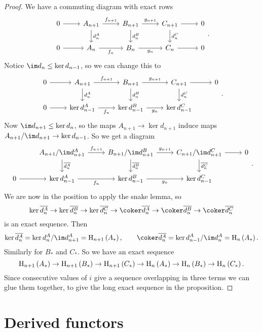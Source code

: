 \begin{proof}
We have a commuting diagram with exact rows
$$
\begin{tikzcd}
0 \arrow{r} & A_{n + 1} \arrow{r}{f_{n + 1}} \arrow{d}{d_n^A} & B_{n + 1} \arrow{r}{g_{n + 1}} \arrow{d}{d_n^B} & C_{n + 1} \arrow{r} \arrow{d}{d_n^C} & 0 \\
0 \arrow{r} & A_n \arrow{r}[swap]{f_n} & B_n \arrow{r}[swap]{g_n} & C_n \arrow{r} & 0
\end{tikzcd}.
$$
Notice $ \im d_n \le \ker d_{n - 1} $, so we can change this to
$$
\begin{tikzcd}
0 \arrow{r} & A_{n + 1} \arrow{r}{f_{n + 1}} \arrow{d}{d_n^A} & B_{n + 1} \arrow{r}{g_{n + 1}} \arrow{d}{d_n^B} & C_{n + 1} \arrow{r} \arrow{d}{d_n^C} & 0 \\
0 \arrow{r} & \ker d_{n - 1}^A \arrow{r}[swap]{f_n} & \ker d_{n - 1}^B \arrow{r}[swap]{g_n} & \ker d_{n - 1}^C &
\end{tikzcd}.
$$
Now $ \im d_{n + 1} \le \ker d_n $, so the maps $ A_{n + 1} \to \ker d_{n + 1} $ induce maps $ A_{n + 1} / \im d_{n + 1} \to \ker d_{n - 1} $. So we get a diagram
$$
\begin{tikzcd}
& A_{n + 1} / \im d_{n + 1}^A \arrow{r}{f_{n + 1}} \arrow{d}{\overline{d_n^A}} & B_{n + 1} / \im d_{n + 1}^B \arrow{r}{g_{n + 1}} \arrow{d}{\overline{d_n^B}} & C_{n + 1} / \im d_{n + 1}^C \arrow{r} \arrow{d}{\overline{d_n^C}} & 0 \\
0 \arrow{r} & \ker d_{n - 1}^A \arrow{r}[swap]{f_n} & \ker d_{n - 1}^B \arrow{r}[swap]{g_n} & \ker d_{n - 1}^C &
\end{tikzcd}.
$$
We are now in the position to apply the snake lemma, so
$$ \ker \overline{d_n^A} \to \ker \overline{d_n^B} \to \ker \overline{d_n^C} \to \coker \overline{d_n^A} \to \coker \overline{d_n^B} \to \coker \overline{d_n^C} $$
is an exact sequence. Then
$$ \ker \overline{d_n^A} = \ker d_n^A / \im d_{n + 1}^A = \H_{n + 1}\br{A_*}, \qquad \coker \overline{d_n^A} = \ker d_{n - 1}^A / \im d_n^A = \H_n\br{A_*}. $$
Similarly for $ B_* $ and $ C_* $. So we have an exact sequence
$$ \H_{n + 1}\br{A_*} \to \H_{n + 1}\br{B_*} \to \H_{n + 1}\br{C_*} \to \H_n\br{A_*} \to \H_n\br{B_*} \to \H_n\br{C_*}. $$
Since consecutive values of $ i $ give a sequence overlapping in three terms we can glue them together, to give the long exact sequence in the proposition.
\end{proof}

\pagebreak

\section{Derived functors}

